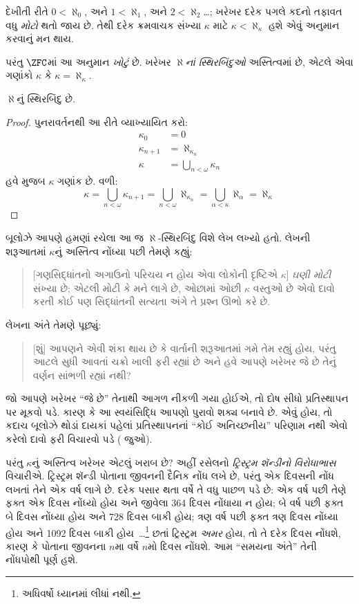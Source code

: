 દેખીતી રીતે $0 < \aleph_0$, અને $1 < \aleph_1$,
અને $2 < \aleph_2$\ldots; ખરેખર દરેક પગલે કદનો
તફાવત વધુ \emph{મોટો} થતો જાય છે. તેથી દરેક
ક્રમવાચક સંખ્યા $\kappa$ માટે
$\kappa< \aleph_\kappa$ હશે એવું અનુમાન કરવાનું
મન થાય.

પરંતુ $\ZFC$માં આ અનુમાન \emph{ખોટું} છે.
ખરેખર \emph{$\aleph$નાં સ્થિરબિંદુઓ} અસ્તિત્વમાં
છે, એટલે એવા ગણાંકો $\kappa$ કે
$\kappa=\aleph_\kappa$.

\begin{prop}
$\aleph$નું સ્થિરબિંદુ છે.
\end{prop}

\begin{proof}
પુનરાવર્તનથી આ રીતે વ્યાખ્યાયિત કરો:
\begin{align*}
	\kappa_0 &= 0\\
	\kappa_{n+1} &= \aleph_{\kappa_n}\\
	\kappa&= \bigcup_{n < \omega}\kappa_n
\end{align*}
હવે 
મુજબ $\kappa$ ગણાંક છે. વળી:
\[
	\kappa= \bigcup_{n < \omega} \kappa_{n+1} = 
	\bigcup_{n < \omega}\aleph_{\kappa_n} = 
	\bigcup_{\alpha < \kappa}\aleph_\alpha = \aleph_\kappa
\]
\end{proof}

બૂલોઝે આપણે હમણાં રચેલા આ જ $\aleph$-સ્થિરબિંદુ
વિશે લેખ લખ્યો હતો. લેખની શરૂઆતમાં $\kappa$નું
અસ્તિત્વ નોંધ્યા પછી તેમણે કહ્યું:
\begin{quote}
	[ગણસિદ્ધાંતનો અગાઉનો પરિચય ન હોય એવા લોકોની
	દૃષ્ટિએ $\kappa$] \emph{ઘણી મોટી} સંખ્યા છે; એટલી
	મોટી કે મને લાગે છે, ઓછામાં ઓછી $\kappa$ વસ્તુઓ
	છે એવો દાવો કરતી કોઈ પણ સિદ્ધાંતની સત્યતા અંગે
	તે પ્રશ્ન ઊભો કરે છે.
	\citep[p.~257]{Boolos2000}
\end{quote}
લેખના અંતે તેમણે પૂછ્યું:
\begin{quote}
	[શું] આપણને એવી શંકા થાય છે કે વાર્તાની શરૂઆતમાં
	ગમે તેમ રહ્યું હોય, પરંતુ આટલે સુધી આવતાં ચક્રો
	ખાલી ફરી રહ્યાં છે અને હવે આપણે ખરેખર જે છે
	તેનું વર્ણન સાંભળી રહ્યાં નથી?
	\citep[p.~268]{Boolos2000}
\end{quote}
જો આપણે ખરેખર ``જે છે'' તેનાથી આગળ નીકળી
ગયા હોઈએ, તો દોષ સીધો પ્રતિસ્થાપન પર મૂકવો પડે.
કારણ કે આ સ્વયંસિદ્ધિ આપણો પુરાવો શક્ય બનાવે છે.
એવું હોય, તો કદાચ બૂલોઝે થોડાં દાયકાં પહેલાં
પ્રતિસ્થાપનનાં ``કોઈ અનિચ્છનીય'' પરિણામ નથી
એવો કરેલો દાવો ફરી વિચારવો પડે
( જુઓ).

પરંતુ $\kappa$નું અસ્તિત્વ ખરેખર એટલું ખરાબ છે?
અહીં રસેલનો \emph{ટ્રિસ્ટ્રમ શૅન્ડીનો વિરોધાભાસ}
વિચારીએ. ટ્રિસ્ટ્રમ શૅન્ડી પોતાના જીવનની દૈનિક
નોંધ લખે છે, પરંતુ એક દિવસની નોંધ લખતાં તેને એક
વર્ષ લાગે છે. દરેક પસાર થતા વર્ષે તે વધુ પાછળ
પડે છે: એક વર્ષ પછી તેણે ફક્ત એક દિવસ નોંધ્યો
હોય અને જીવેલા 364 દિવસ નોંધાયા ન હોય; બે વર્ષ
પછી ફક્ત બે દિવસ નોંધ્યા હોય અને 728 દિવસ બાકી
હોય; ત્રણ વર્ષ પછી ફક્ત ત્રણ દિવસ નોંધ્યા હોય
અને 1092 દિવસ બાકી હોય~\dots\footnote{અધિવર્ષો
ધ્યાનમાં લીધાં નથી.} છતાં ટ્રિસ્ટ્રમ
\emph{અમર} હોય, તો તે દરેક દિવસ નોંધશે, કારણ
કે પોતાના જીવનના $n$મા વર્ષે $n$મો દિવસ
નોંધશે. આમ ``સમયના અંતે'' તેની નોંધપોથી પૂર્ણ હશે.


